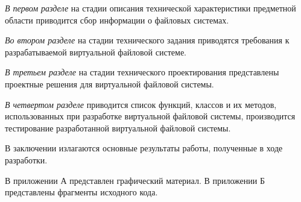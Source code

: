 \emph{В первом разделе} на стадии описания технической характеристики предметной области приводится сбор информации о файловых системах.

\emph{Во втором разделе} на стадии технического задания приводятся требования к разрабатываемой виртуальной файловой системе.

\emph{В третьем разделе} на стадии технического проектирования представлены проектные решения для виртуальной файловой системы.

\emph{В четвертом разделе} приводится список функций, классов и их методов, использованных при разработке виртуальной файловой системы, производится тестирование разработанной виртуальной файловой системы.

В заключении излагаются основные результаты работы, полученные в ходе разработки.

В приложении А представлен графический материал.
В приложении Б представлены фрагменты исходного кода. 
